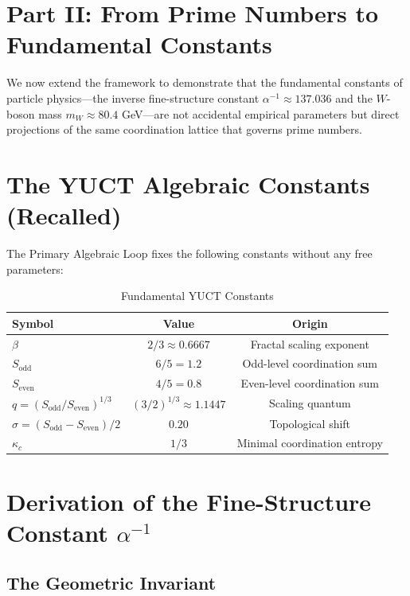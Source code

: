\documentclass[12pt,a4paper]{article}
\theoremstyle{remark}
\newcommand{\kappac}{\kappa_c}
\newcommand{\Sodd}{S_{\mathrm{odd}}}
\newcommand{\Seven}{S_{\mathrm{even}}}
\begin{document}
	\newpage
	\section{Part II: From Prime Numbers to Fundamental Constants}
	\label{sec:part2}
	
	We now extend the framework to demonstrate that the fundamental constants of particle physics---the inverse fine-structure constant \(\alpha^{-1} \approx 137.036\) and the \(W\)-boson mass \(m_W \approx 80.4\) GeV---are not accidental empirical parameters but direct projections of the same coordination lattice that governs prime numbers.
	
	\section{The YUCT Algebraic Constants (Recalled)}
	
	The Primary Algebraic Loop fixes the following constants without any free parameters:
	
	\begin{table}[H]
		\centering
		\caption{Fundamental YUCT Constants}
		\label{tab:yuct-constants}
		\begin{tabular}{lcc}
			\toprule
			\textbf{Symbol} & \textbf{Value} & \textbf{Origin} \\
			\midrule
			\(\beta\) & \(2/3 \approx 0.6667\) & Fractal scaling exponent \\
			\(\Sodd\) & \(6/5 = 1.2\) & Odd-level coordination sum \\
			\(\Seven\) & \(4/5 = 0.8\) & Even-level coordination sum \\
			\(q = (\Sodd/\Seven)^{1/3}\) & \((3/2)^{1/3} \approx 1.1447\) & Scaling quantum \\
			\(\sigma = (\Sodd - \Seven)/2\) & \(0.20\) & Topological shift \\
			\(\kappac\) & \(1/3\) & Minimal coordination entropy \\
			\bottomrule
		\end{tabular}
	\end{table}
	
	\section{Derivation of the Fine-Structure Constant \(\alpha^{-1}\)}
	
	\subsection{The Geometric Invariant}
	
\end{document}
